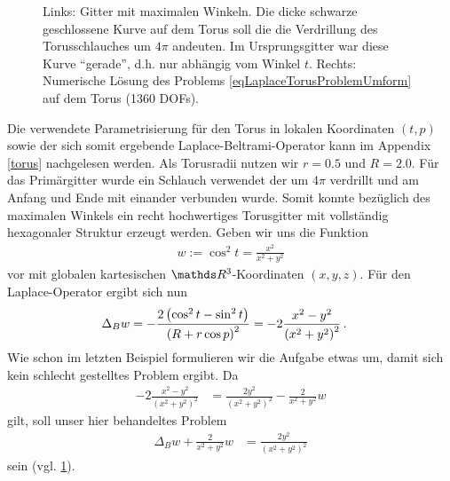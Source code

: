 \begin{figure}
\begin{minipage}[t]{0.49\textwidth}
      \end{minipage}
      \caption[Laplace auf Torus]{Links: Gitter mit maximalen Winkeln.
                                         Die dicke schwarze geschlossene Kurve auf dem Torus soll die die Verdrillung des Torusschlauches um \( 4\pi \) andeuten.
                                         Im Ursprungsgitter war diese Kurve "`gerade"', d.h. nur abhängig vom Winkel \( t \).
                                  Rechts: Numerische Lösung des Problems \eqref{eqLaplaceTorusProblemUmform} auf dem Torus (1360 DOFs).}
      \label{figLaplaceTorus}
    \end{figure}

    \begin{beispiel}[Torus]
      Die verwendete Parametrisierung für den Torus in lokalen Koordinaten \( (t,p) \) sowie der sich somit ergebende
      Laplace-Beltrami-Operator kann im Appendix \ref{torus} nachgelesen werden.
      Als Torusradii nutzen wir \( r=0.5 \) und \( R=2.0 \).
      Für das Primärgitter wurde ein Schlauch verwendet der um \( 4\pi \) verdrillt und am Anfang und Ende
      mit einander verbunden wurde.
      Somit konnte bezüglich des maximalen Winkels ein recht hochwertiges Torusgitter mit vollständig
      hexagonaler Struktur erzeugt werden.      
      Geben wir uns die Funktion
      \begin{align}
        w := \cos^{2} t = \frac{x^{2}}{x^{2}+y^{2}}
      \end{align}
      vor mit globalen kartesischen \( \R^{3} \)-Koordinaten \( (x,y,z) \).
      Für den Laplace-Operator ergibt sich nun
      \begin{align}
        \Delta_{B} w &= -\frac{2 \left( \cos^{2} t - \sin^{2} t \right)}{\left( R + r\cos p \right)^{2}} 
                      = -2 \frac{x^{2} - y^{2}}{\left( x^{2} + y^{2} \right)^{2}} \,\text{.}
      \end{align}
      Wie schon im letzten Beispiel formulieren wir die Aufgabe etwas um, damit sich kein schlecht gestelltes
      Problem ergibt.
      Da
      \begin{align}
        -2 \frac{x^{2} - y^{2}}{\left( x^{2} + y^{2} \right)^{2}}
            &= \frac{2 y^{2}}{\left( x^{2} + y^{2} \right)^{2}} - \frac{2}{x^{2}+y^{2}} w
      \end{align}
      gilt, soll unser hier behandeltes Problem
      \begin{align}
        \label{eqLaplaceTorusProblemUmform}
        \Delta_{B} w + \frac{2}{x^{2}+y^{2}} w &= \frac{2 y^{2}}{\left( x^{2} + y^{2} \right)^{2}}
      \end{align}
      sein (vgl. \ref{figLaplaceTorus}).
      

\end{beispiel}

